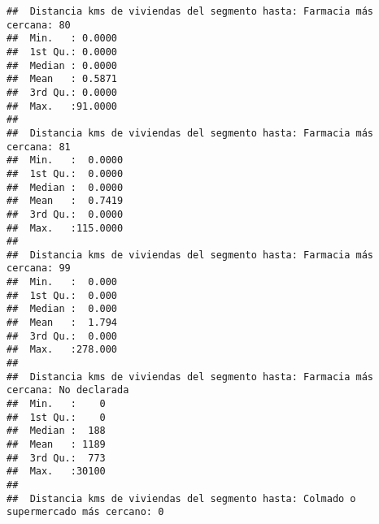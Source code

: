 \documentclass[11pt,]{article}
\begin{document}
\begin{verbatim}
##  Distancia kms de viviendas del segmento hasta: Farmacia más cercana: 80
##  Min.   : 0.0000                                                        
##  1st Qu.: 0.0000                                                        
##  Median : 0.0000                                                        
##  Mean   : 0.5871                                                        
##  3rd Qu.: 0.0000                                                        
##  Max.   :91.0000                                                        
##                                                                         
##  Distancia kms de viviendas del segmento hasta: Farmacia más cercana: 81
##  Min.   :  0.0000                                                       
##  1st Qu.:  0.0000                                                       
##  Median :  0.0000                                                       
##  Mean   :  0.7419                                                       
##  3rd Qu.:  0.0000                                                       
##  Max.   :115.0000                                                       
##                                                                         
##  Distancia kms de viviendas del segmento hasta: Farmacia más cercana: 99
##  Min.   :  0.000                                                        
##  1st Qu.:  0.000                                                        
##  Median :  0.000                                                        
##  Mean   :  1.794                                                        
##  3rd Qu.:  0.000                                                        
##  Max.   :278.000                                                        
##                                                                         
##  Distancia kms de viviendas del segmento hasta: Farmacia más cercana: No declarada
##  Min.   :    0                                                                    
##  1st Qu.:    0                                                                    
##  Median :  188                                                                    
##  Mean   : 1189                                                                    
##  3rd Qu.:  773                                                                    
##  Max.   :30100                                                                    
##                                                                                   
##  Distancia kms de viviendas del segmento hasta: Colmado o supermercado más cercano: 0

\end{verbatim}
\end{document}
